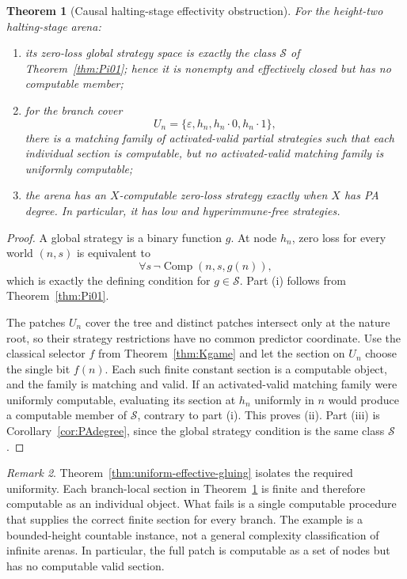 \documentclass[11pt]{article}
\theoremstyle{plain}
\newtheorem{theorem}{Theorem}[section]
\theoremstyle{definition}
\theoremstyle{remark}
\newtheorem{remark}[theorem]{Remark}
\begin{document}
\begin{theorem}[Causal halting-stage effectivity obstruction]
\label{thm:K-arena}
For the height-two halting-stage arena:
\begin{enumerate}[label=(\roman*)]
\item its zero-loss global strategy space is exactly the class $\mathcal S$ of
Theorem~\ref{thm:Pi01}; hence it is nonempty and effectively closed but has no
computable member;
\item for the branch cover
\[
U_n=\{\varepsilon,h_n,h_n\!\cdot0,h_n\!\cdot1\},
\]
there is a matching family of activated-valid partial strategies such that each
individual section is computable, but no activated-valid matching family is
uniformly computable;
\item the arena has an $X$-computable zero-loss strategy exactly when $X$ has
PA degree. In particular, it has low and hyperimmune-free strategies.
\end{enumerate}
\end{theorem}

\begin{proof}
A global strategy is a binary function $g$. At node $h_n$, zero loss for every
world $(n,s)$ is equivalent to
\[
\forall s\,\neg\operatorname{Comp}(n,s,g(n)),
\]
which is exactly the defining condition for $g\in\mathcal S$. Part (i) follows
from Theorem~\ref{thm:Pi01}.

The patches $U_n$ cover the tree and distinct patches intersect only at the
nature root, so their strategy restrictions have no common predictor coordinate.
Use the classical selector $f$ from Theorem~\ref{thm:Kgame} and let the section
on $U_n$ choose the single bit $f(n)$. Each such finite constant section is a
computable object, and the family is matching and valid. If an activated-valid
matching family were uniformly computable, evaluating its section at $h_n$
uniformly in $n$ would produce a computable member of $\mathcal S$, contrary to
part (i). This proves (ii). Part (iii) is Corollary~\ref{cor:PAdegree}, since the
global strategy condition is the same class $\mathcal S$.
\end{proof}

\begin{remark}
Theorem~\ref{thm:uniform-effective-gluing} isolates the required uniformity.
Each branch-local section in Theorem~\ref{thm:K-arena} is finite and therefore
computable as an individual object. What fails is a single computable procedure
that supplies the correct finite section for every branch. The example is a
bounded-height countable instance, not a general complexity classification of
infinite arenas. In particular, the full patch is computable as a set of nodes
but has no computable valid section.
\end{remark}
\end{document}
